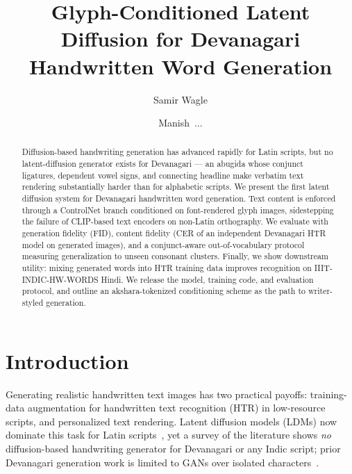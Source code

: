 \documentclass{llncs}
\begin{document}
\title{Glyph-Conditioned Latent Diffusion for Devanagari Handwritten
Word Generation}

\author{Samir Wagle \and Manish~...}

\maketitle

\begin{abstract}
Diffusion-based handwriting generation has advanced rapidly for Latin
scripts, but no latent-diffusion generator exists for Devanagari — an
abugida whose conjunct ligatures, dependent vowel signs, and connecting
headline make verbatim text rendering substantially harder than for
alphabetic scripts. We present the first latent diffusion system for
Devanagari handwritten word generation. Text content is enforced through a
ControlNet branch conditioned on font-rendered glyph images, sidestepping
the failure of CLIP-based text encoders on non-Latin orthography. We
evaluate with generation fidelity (FID), content fidelity (CER of an
independent Devanagari HTR model on generated images), and a conjunct-aware
out-of-vocabulary protocol measuring generalization to unseen consonant
clusters. Finally, we show downstream utility: mixing generated words into
HTR training data improves recognition on IIIT-INDIC-HW-WORDS Hindi. We
release the model, training code, and evaluation protocol, and outline an
akshara-tokenized conditioning scheme as the path to writer-styled
generation.
\end{abstract}

\section{Introduction}

Generating realistic handwritten text images has two practical payoffs:
training-data augmentation for handwritten text recognition (HTR) in
low-resource scripts, and personalized text rendering. Latent diffusion
models (LDMs) now dominate this task for Latin
scripts~\cite{nikolaidou2023wordstylist,nikolaidou2024diffusionpen,dai2024onedm},
yet a survey of the literature shows \emph{no} diffusion-based handwriting
generator for Devanagari or any Indic script; prior Devanagari generation
work is limited to GANs over isolated characters~\cite{nepaligan2022}.
\end{document}
